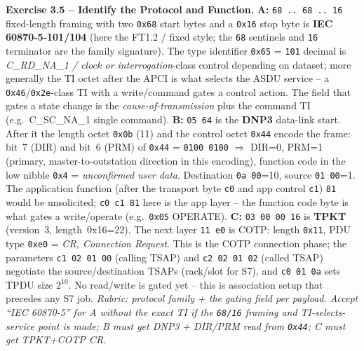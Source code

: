 \documentclass[11pt,a4paper]{article}
\begin{document}
\begin{solutionbox}
\textbf{Exercise 3.5 -- Identify the Protocol and Function.}
\textbf{A:} \texttt{68 .. 68 .. 16} fixed-length framing with two
\texttt{0x68} start bytes and a \texttt{0x16} stop byte is
\textbf{IEC 60870-5-101/104} (here the FT1.2 / fixed style; the \texttt{68}
sentinels and \texttt{16} terminator are the family signature). The type
identifier \texttt{0x65} = \texttt{101} decimal is \emph{C\_RD\_NA\_1 / clock
or interrogation}-class control depending on dataset; more generally the TI
octet after the APCI is what selects the ASDU service -- a
\texttt{0x46}/\texttt{0x2e}-class TI with a write/command gates a control
action. The field that gates a state change is the \emph{cause-of-transmission}
plus the command TI (e.g.\ C\_SC\_NA\_1 single command).
\textbf{B:} \texttt{05 64} is the \textbf{DNP3} data-link start. After it the
length octet \texttt{0x0b} (11) and the control octet \texttt{0x44} encode
the frame: bit~7 (DIR) and bit~6 (PRM) of \texttt{0x44} = \texttt{0100 0100}
$\Rightarrow$ DIR=0, PRM=1 (primary, master-to-outstation direction in this
encoding), function code in the low nibble \texttt{0x4} = \emph{unconfirmed
user data}. Destination \texttt{0a 00}=10, source \texttt{01 00}=1. The
application function (after the transport byte \texttt{c0} and app control
\texttt{c1}) \texttt{81} would be unsolicited; \texttt{c0 c1 81}
here is the app layer -- the function code byte is what gates a write/operate
(e.g.\ \texttt{0x05} OPERATE).
\textbf{C:} \texttt{03 00 00 16} is \textbf{TPKT} (version~3, length~0x16=22).
The next layer \texttt{11 e0} is COTP: length \texttt{0x11}, PDU type
\texttt{0xe0} = \emph{CR, Connection Request}. This is the COTP connection
phase; the parameters \texttt{c1 02 01 00} (calling TSAP) and
\texttt{c2 02 01 02} (called TSAP) negotiate the source/destination TSAPs
(rack/slot for S7), and \texttt{c0 01 0a} sets TPDU size $2^{10}$. No
read/write is gated yet -- this is association setup that precedes any S7 job.
\textit{Rubric: protocol family + the gating field per payload. Accept
``IEC 60870-5'' for A without the exact TI if the \texttt{68/16} framing and
TI-selects-service point is made; B must get DNP3 + DIR/PRM read from
\texttt{0x44}; C must get TPKT+COTP CR.}
\end{solutionbox}
\end{document}
